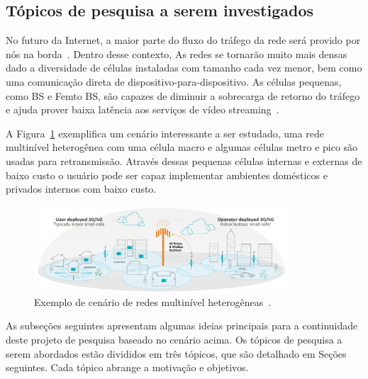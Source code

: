 \subsection{Tópicos de pesquisa a serem investigados}
\label{ch:proposal}
No futuro da Internet, a maior parte do fluxo do tráfego da rede será provido por nós na borda~\cite{cisco:forecast2017}.
Dentro desse contexto, 
As redes se tornarão muito mais densas dado a diversidade de células instaladas com tamanho cada vez menor, bem como uma comunicação direta de dispositivo-para-dispositivo. As células pequenas, como BS e Femto BS,
são capazes %
de diminuir a sobrecarga de retorno do tráfego e ajuda prover baixa latência aos serviços de vídeo streaming~\cite{guan:2019:CLC}.

A Figura~\ref{fig:scenario-ex-lte-wifi} exemplifica um cenário interessante a ser estudado, uma rede multinível heterogênea com uma célula macro e algumas células metro e pico são usadas para retransmissão. Através dessas pequenas células internas e externas de baixo custo o usuário pode ser capaz implementar ambientes domésticos e privados internos com baixo custo.

\vspace{0.8cm}
\begin{figure}[htpb]
	\centering
	\includegraphics[width=0.85\textwidth]{img/hetnet-lte-wifi-v2.png}
	\caption{Exemplo de cenário de redes multinível heterogêneas~\cite{Qualcomm2013}.}
	\label{fig:scenario-ex-lte-wifi}
\end{figure}

As subseções seguintes apresentam algumas ideias principais para a continuidade deste projeto de pesquisa baseado no cenário acima. Os tópicos de pesquisa a serem abordados estão divididos em três tópicos, que são
detalhado em Seções seguintes. Cada tópico abrange a motivação e objetivos.

